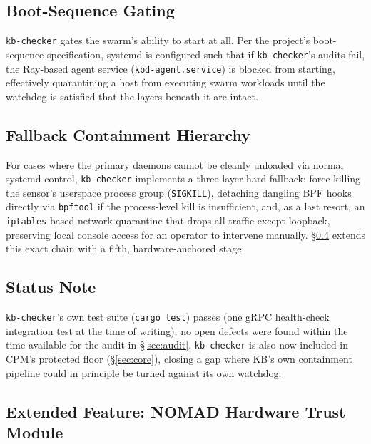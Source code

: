\documentclass{article}
\begin{document}
\subsection{Boot-Sequence Gating}

\texttt{kb-checker} gates the swarm's ability to start at all. Per the
project's boot-sequence specification, systemd is configured such that
if \texttt{kb-checker}'s audits fail, the Ray-based agent service
(\texttt{kbd-agent.service}) is blocked from starting, effectively
quarantining a host from executing swarm workloads until the watchdog
is satisfied that the layers beneath it are intact.

\subsection{Fallback Containment Hierarchy}

For cases where the primary daemons cannot be cleanly unloaded via
normal systemd control, \texttt{kb-checker} implements a three-layer
hard fallback: force-killing the sensor's userspace process group
(\texttt{SIGKILL}), detaching dangling BPF hooks directly via
\texttt{bpftool} if the process-level kill is insufficient, and, as a
last resort, an \texttt{iptables}-based network quarantine that drops
all traffic except loopback, preserving local console access for an
operator to intervene manually. \S\ref{sec:nomad} extends this exact
chain with a fifth, hardware-anchored stage.

\subsection{Status Note}

\texttt{kb-checker}'s own test suite (\texttt{cargo test}) passes (one
gRPC health-check integration test at the time of writing); no open
defects were found within the time available for the audit in
\S\ref{sec:audit}. \texttt{kb-checker} is also now included in CPM's
protected floor (\S\ref{sec:core}), closing a gap where KB's own
containment pipeline could in principle be turned against its own
watchdog.

\subsection{Extended Feature: NOMAD Hardware Trust Module}
\label{sec:nomad}
\end{document}
